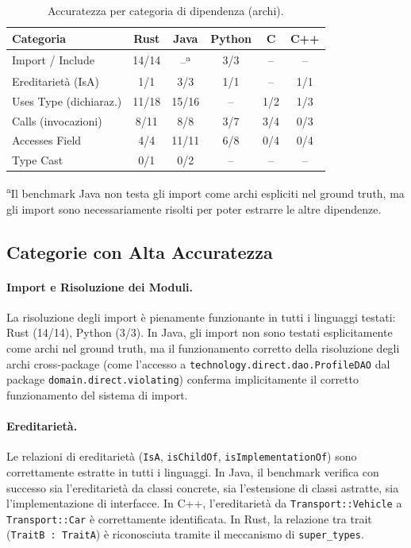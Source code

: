 \begin{table}[ht]
  \centering
  \caption{Accuratezza per categoria di dipendenza (archi).}
  \label{tab:risultati-categoria}
  \begin{tabular}{l c c c c c}
    \hline
    \textbf{Categoria} & \textbf{Rust} & \textbf{Java} &
    \textbf{Python} & \textbf{C} & \textbf{C++} \\
    \hline
    Import / Include       & 14/14 & --\textsuperscript{a}    & 3/3
    & --    & --   \\
    Ereditarietà (IsA)     & 1/1   & 3/3  & 1/1   & --    & 1/1  \\
    Uses Type (dichiaraz.) & 11/18 & 15/16 & --   & 1/2   & 1/3  \\
    Calls (invocazioni)    & 8/11  & 8/8  & 3/7   & 3/4   & 0/3  \\
    Accesses Field         & 4/4   & 11/11 & 6/8  & 0/4   & 0/4  \\
    Type Cast              & 0/1   & 0/2  & --    & --    & --   \\
    \hline
  \end{tabular}
  \begin{flushleft}
    \textsuperscript{a}\footnotesize{Il benchmark Java non testa gli
      import come archi espliciti nel ground truth, ma gli import sono
    necessariamente risolti per poter estrarre le altre dipendenze.}
  \end{flushleft}
\end{table}

\subsection{Categorie con Alta Accuratezza}

\paragraph{Import e Risoluzione dei Moduli.}
La risoluzione degli import è pienamente funzionante in tutti i
linguaggi testati: Rust (14/14), Python (3/3). In Java, gli import
non sono testati esplicitamente come archi nel ground truth, ma il
funzionamento corretto della risoluzione degli archi cross-package
(come l'accesso a \texttt{technology.direct.dao.ProfileDAO} dal
package \texttt{domain.direct.violating}) conferma implicitamente il
corretto funzionamento del sistema di import.

\paragraph{Ereditarietà.}
Le relazioni di ereditarietà (\texttt{IsA}, \texttt{isChildOf},
\texttt{isImplementationOf}) sono correttamente estratte in tutti i
linguaggi. In Java, il benchmark verifica con successo sia
l'ereditarietà da classi concrete, sia l'estensione di classi
astratte, sia l'implementazione di interfacce. In C++, l'ereditarietà
da \texttt{Transport::Vehicle} a \texttt{Transport::Car} è
correttamente identificata. In Rust, la relazione tra trait
(\texttt{TraitB : TraitA}) è riconosciuta tramite il meccanismo di
\texttt{super\_types}.

